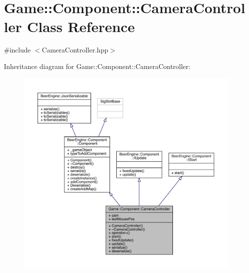 \hypertarget{class_game_1_1_component_1_1_camera_controller}{}\section{Game\+:\+:Component\+:\+:Camera\+Controller Class Reference}
\label{class_game_1_1_component_1_1_camera_controller}


{\ttfamily \#include $<$Camera\+Controller.\+hpp$>$}



Inheritance diagram for Game\+:\+:Component\+:\+:Camera\+Controller\+:\nopagebreak
\begin{figure}[H]
\begin{center}
\leavevmode
\includegraphics[width=350pt]{class_game_1_1_component_1_1_camera_controller__inherit__graph}
\end{center}
\end{figure}


